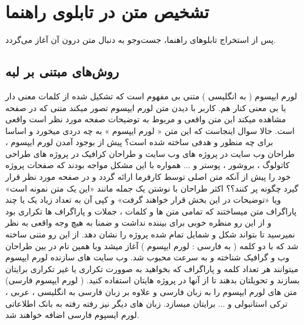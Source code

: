 \documentclass[oneside,openany,msc]{SBU-Thesis}
\begin{document}
\section{تشخیص متن در تابلوی راهنما}
\label{sec:textReview}
پس از استخراج تابلوهای راهنما، جست‌وجو به دنبال متن درون آن آغاز می‌گردد.
\subsection{روش‌های مبتنی بر لبه}

لورم ایپسوم ( به انگلیسی  ) متنی بی مفهوم است که تشکیل شده از کلمات معنی دار یا بی معنی کنار هم. کاربر با دیدن متن لورم ایپسوم تصور میکند متنی که در صفحه مشاهده میکند این متن واقعی و مربوط به توضیحات صفحه مورد نظر است واقعی است. حالا سوال اینجاست که این متن « لورم ایپسوم » به چه دردی میخورد و اساسا برای چه منظور و هدفی ساخته شده است؟ پیش از بوجود آمدن لورم ایپسوم ، طراحان وب سایت در پروژه های وب سایت و طراحان کرافیک در پروژه های طراحی کاتولوگ ، بروشور ، پوستر و ... همواره با این مشکل مواجه بودند که صفحات پروژه خود را پیش از آنکه متن اصلی توسط کارفرما ارائه گردد و در صفحه مورد نظر قرار گیرد چگونه پر کنند؟؟ اکثر طراحان با نوشتن یک جمله مانند «این یک متن نمونه است» ویا «توضیحات در این بخش قرار خواهند گرفت» و کپی آن به تعداد زیاد یک یا چند پاراگراف متن میساختند که تمامی متن ها و کلمات ، جملات و پاراگراف ها تکراری بود و از این رو منظره خوبی برای بیننده نداشت و ضمنا به هیچ وجه واقعی به نظر نمیرسید تا بتواند شکل و شمایل تمام شده پروژه را نشان دهد. از این رو متنی ساخته شد که با دو کلمه ( به فارسی : لورم ایپسوم ) آغاز میشد وبا همین نام در بین طراحان وب و گرافیک شناخته و به سرعت محبوب شد. وب سایت های سازنده لورم ایپسوم میتوانند هر تعداد کلمه و پاراگراف که بخواهید به صوورت تکراری یا غیر تکراری برایتان بسازند و تحویلتان بدهند تا از آنها در پروژه هایتان استفاده کنید. ( لورم ایپسوم فارسی) متن های لورم ایپسوم را به زبان فارسی و علاوه بر زبان فارسی به انگلیسی ، عربی ، ترکی استانبولی و ... برایتان میسازد. زبان های دیگر نیز رفته رفته به بانک اطلاعاتی لورم ایسپوم فارسی اضافه خواهند شد.  
\end{document}
